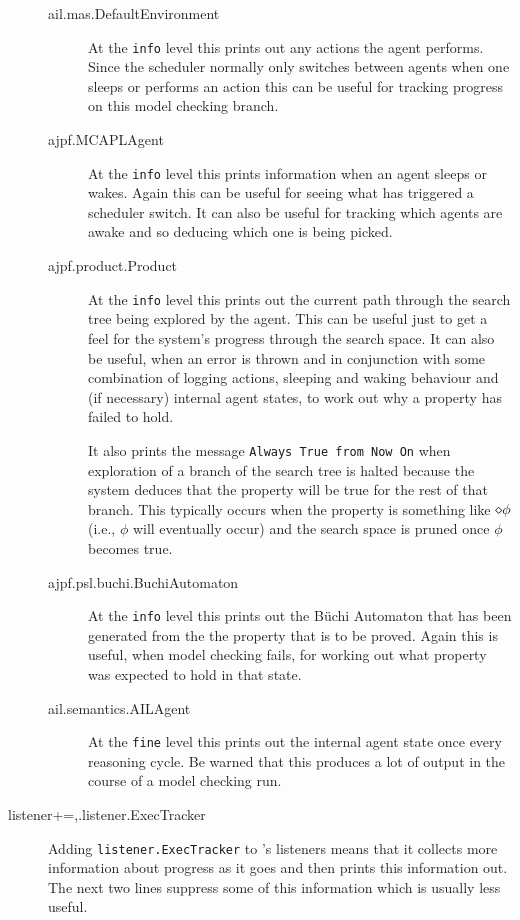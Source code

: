 \begin{sloppypar}
\begin{description}
\begin{description}
\item[ail.mas.DefaultEnvironment] At the \texttt{info} level this prints out any actions the agent performs.  Since the scheduler normally only switches between agents when one sleeps or performs an action this can be useful for tracking progress on this model checking branch.
\item[ajpf.MCAPLAgent] At the \texttt{info} level this prints information when an agent sleeps or wakes.  Again this can be useful for seeing what has triggered a scheduler switch.  It can also be useful for tracking which agents are awake and so deducing which one is being picked.
\item[ajpf.product.Product] At the \texttt{info} level this prints out the current path through the search tree being explored by the agent.  This can be useful just to get a feel for the system's progress through the search space.  It can also be useful, when an error is thrown and in conjunction with some combination of logging actions, sleeping and waking behaviour and (if necessary) internal agent states, to work out why a property has failed to hold.

It also prints the message \texttt{Always True from Now On} when exploration of a branch of the search tree is halted because the system deduces that the property will be true for the rest of that branch.  This typically occurs when the property is something like $\diamond \phi$ (i.e., $\phi$ will eventually occur) and the search space is pruned once $\phi$ becomes true.
\item[ajpf.psl.buchi.BuchiAutomaton] At the \texttt{info} level this prints out the B\"{u}chi Automaton that has been generated from the the property that is to be proved.  Again this is useful, when model checking fails, for working out what property was expected to hold in that state.
\item[ail.semantics.AILAgent] At the \texttt{fine} level this prints out the internal agent state once every reasoning cycle.  Be warned that this produces a lot of output in the course of a model checking run.
\end{description}
\item[listener+=,.listener.ExecTracker] Adding \texttt{listener.ExecTracker} to \jpf's listeners means that it collects more information about progress as it goes and then prints this information out.  The next two lines suppress some of this information which is usually less useful. 
\end{description}
\end{sloppypar}

